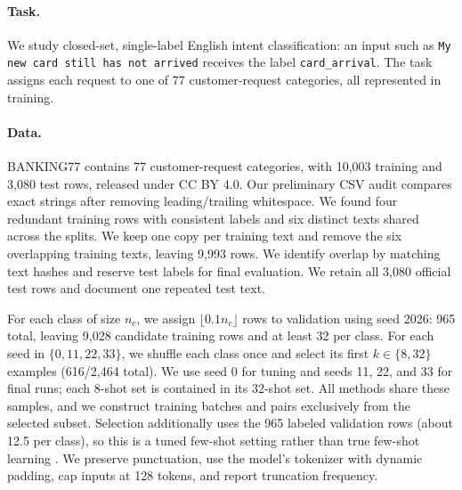 \documentclass{article}
\begin{document}
\paragraph{Task.}
We study closed-set, single-label English intent classification: an input such as \texttt{My new card still has not arrived} receives the label \texttt{card\_arrival}. The task assigns each request to one of 77 customer-request categories, all represented in training.

\paragraph{Data.}
BANKING77 \cite{casanueva2020intent,bankinghub} contains 77 customer-request categories, with 10,003 training and 3,080 test rows, released under CC BY 4.0. Our preliminary CSV audit compares exact strings after removing leading/trailing whitespace. We found four redundant training rows with consistent labels and six distinct texts shared across the splits. We keep one copy per training text and remove the six overlapping training texts, leaving 9,993 rows. We identify overlap by matching text hashes and reserve test labels for final evaluation. We retain all 3,080 official test rows and document one repeated test text.

For each class of size $n_c$, we assign $\lfloor0.1n_c\rfloor$ rows to validation using seed 2026: 965 total, leaving 9,028 candidate training rows and at least 32 per class. For each seed in $\{0,11,22,33\}$, we shuffle each class once and select its first $k\in\{8,32\}$ examples (616/2,464 total). We use seed 0 for tuning and seeds 11, 22, and 33 for final runs; each 8-shot set is contained in its 32-shot set. All methods share these samples, and we construct training batches and pairs exclusively from the selected subset. Selection additionally uses the 965 labeled validation rows (about 12.5 per class), so this is a tuned few-shot setting rather than true few-shot learning \cite{perez2021true}. We preserve punctuation, use the model's tokenizer with dynamic padding, cap inputs at 128 tokens, and report truncation frequency.
\end{document}
